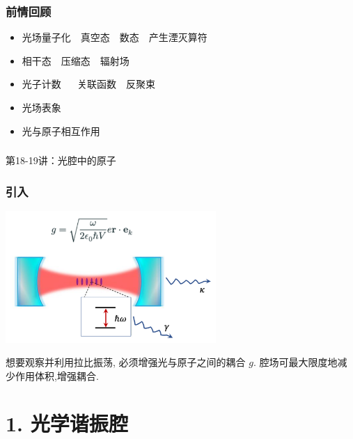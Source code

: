 \begin{frame}
    \frametitle{前情回顾}
    \begin{itemize}
        \item 光场量子化~~真空态~~数态~~产生湮灭算符 
        \item 相干态~~压缩态~~辐射场 
        \item 光子计数 ~~ 关联函数~~反聚束
        \item 光场表象
        \item 光与原子相互作用
    \end{itemize}     
\end{frame}

\begin{frame} [plain]
    \frametitle{}
    \Background[1] 
    \begin{center}
    {\huge 第18-19讲：光腔中的原子}
    \end{center}  
    \addtocounter{framenumber}{-1}   
\end{frame}


\begin{frame} 
\frametitle{引入}
  \begin{center}
       \includegraphics[width=0.6\textwidth]{figs/25.png}
  \end{center}
  想要观察并利用拉比振荡, 必须增强光与原子之间的耦合 $g$. 腔场可最大限度地减少作用体积,增强耦合.
\end{frame}

\section{1. 光学谐振腔}

